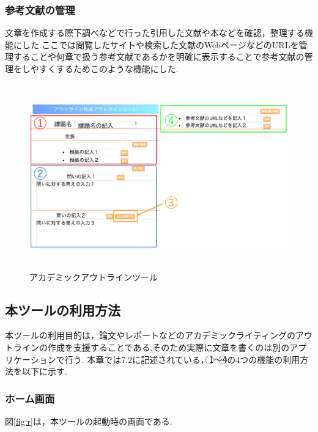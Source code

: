 \documentclass[a4j,12pt]{jarticle}
\begin{document}
\subsubsection{参考文献の管理}
文章を作成する際下調べなどで行った引用した文献や本などを確認，整理する機能にした.ここでは閲覧したサイトや検索した文献のWebページなどのURLを管理することや何章で扱う参考文献であるかを明確に表示することで参考文献の管理をしやすくするためこのような機能にした.
\newpage
\begin{figure}[h]
\begin{center}
 \includegraphics[clip,width=130mm,height=80mm]{figure/pp01.pdf}
\end{center}
 \caption{アカデミックアウトラインツール}
 \label{fig:g}
\end{figure}
\newpage
\subsection{本ツールの利用方法}
本ツールの利用目的は，論文やレポートなどのアカデミックライティングのアウトラインの作成を支援することである.そのため実際に文章を書くのは別のアプリケーションで行う.
本章では7.2に記述されている，\textcircled{\scriptsize 1}〜\textcircled{\scriptsize  4}の4つの機能の利用方法を以下に示す.

\subsubsection{ホーム画面}
図\ref{fig:r}は，本ツールの起動時の画面である.
\end{document}
